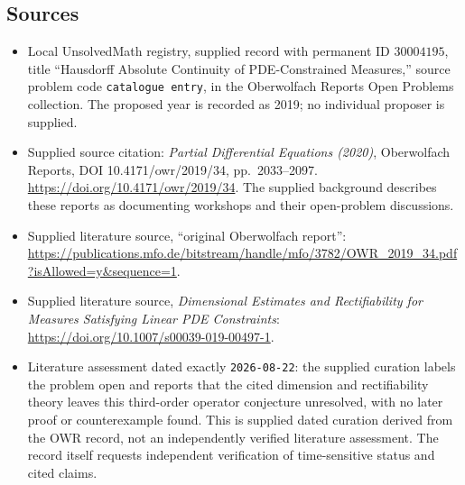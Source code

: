 \documentclass[11pt]{article}
\begin{document}
\subsection{Sources}
\begin{itemize}
\item Local UnsolvedMath registry, supplied record with permanent ID \(30004195\), title ``Hausdorff Absolute Continuity of PDE-Constrained Measures,'' source problem code \texttt{catalogue entry}, in the Oberwolfach Reports Open Problems collection. The proposed year is recorded as 2019; no individual proposer is supplied.
\item Supplied source citation: \emph{Partial Differential Equations (2020)}, Oberwolfach Reports, DOI 10.4171/owr/2019/34, pp.\ 2033--2097. \url{https://doi.org/10.4171/owr/2019/34}. The supplied background describes these reports as documenting workshops and their open-problem discussions.
\item Supplied literature source, ``original Oberwolfach report'': \url{https://publications.mfo.de/bitstream/handle/mfo/3782/OWR_2019_34.pdf?isAllowed=y&sequence=1}.
\item Supplied literature source, \emph{Dimensional Estimates and Rectifiability for Measures Satisfying Linear PDE Constraints}: \url{https://doi.org/10.1007/s00039-019-00497-1}.
\item Literature assessment dated exactly \texttt{2026-08-22}: the supplied curation labels the problem open and reports that the cited dimension and rectifiability theory leaves this third-order operator conjecture unresolved, with no later proof or counterexample found. This is supplied dated curation derived from the OWR record, not an independently verified literature assessment. The record itself requests independent verification of time-sensitive status and cited claims.
\end{itemize}
\end{document}
